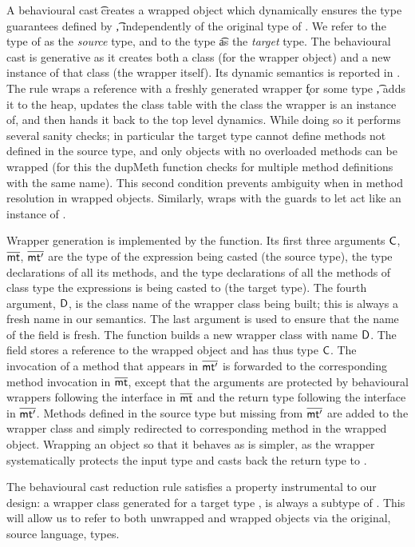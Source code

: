 \documentclass[acmlarge, anonymous, authordraft]{acmart}
\begin{document}
A behavioural cast \BehCast\t\a creates a wrapped object \ap which dynamically ensures the type
guarantees defined by \t, independently of the original type of \a.  We refer to the type of \a as the \emph{source} type, 
and to the type \t as the \emph{target} type.
The behavioural cast is generative as it creates both a class (for the wrapper object)
and a new instance of that class (the wrapper itself). Its dynamic semantics is reported in
. The rule  wraps a reference \a with a freshly generated
wrapper \k for some type \t, adds it to the heap, updates the class table with the class the wrapper is an instance of, 
and then hands it back to the top level dynamics. While doing so it performs several sanity checks; in particular the
target type cannot define methods not defined in the source type, and only objects with no overloaded methods can be wrapped 
(for this the \textsf{dupMeth} function checks for multiple method definitions with the same name).  This second condition 
prevents ambiguity when in method resolution in wrapped objects. Similarly,  wraps
\a with the guards to let \a act like an instance of \any.

Wrapper generation is implemented by the  function.  Its first three arguments \({\sf{C}}\), \(\overline{{\sf{mt}}}\), \(\overline{{\sf{mt'}}}\) are the type
of the expression being casted (the source type), the type declarations of all its methods, and the type declarations of all the
methods of class type the expressions is being casted to (the target type).  The fourth argument, \({\sf{D}}\), is the class name  of 
the wrapper class being built; this is always a fresh name in our semantics. The last argument is used to ensure that the name of
the \that field is  fresh.   The function  builds a new wrapper class with name \({\sf{D}}\).  The field  stores a 
reference to the wrapped object and has thus type \({\sf{C}}\).  The invocation of a method that appears in \(\overline{{\sf{mt'}}}\) is forwarded to 
the corresponding method invocation in \(\overline{{\sf{mt}}}\), except that the arguments are protected by behavioural wrappers following the
interface in \(\overline{{\sf{mt}}}\) and the return type following the interface in \(\overline{{\sf{mt'}}}\).    Methods defined in the source type but missing
from \(\overline{{\sf{mt'}}}\) are added to the wrapper class and simply redirected to corresponding method in the wrapped object.
Wrapping an object so that it behaves as \any is simpler, as the wrapper systematically protects the input type and casts back the 
return type to \any.


The behavioural cast reduction rule satisfies a property instrumental to our design: a wrapper class generated for a target type \D,  is always a subtype of \D.  This will allow us to refer to both
unwrapped and wrapped objects via the original, source language,
types.   
\end{document}
